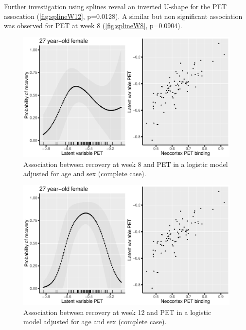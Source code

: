 \documentclass[12pt]{article}
\begin{document}
\vfill

Further investigation using splines reveal an inverted U-shape for the
PET assocation (\autoref{fig:splineW12}, p=0.0128). A similar but non
significant association was observed for PET at week 8 (\autoref{fig:splineW8},
p=0.0904).
\vfill

\begin{figure}[!h]
\centering
\includegraphics[trim={0 0 0 0},width=\textwidth]{./figures/gg-spline-w8.pdf}
\caption{\label{fig:splineW8}Association between recovery at week 8 and PET in a logistic model adjusted for age and sex (complete case).}
\end{figure}

\clearpage

\begin{figure}[!h]
\centering
\includegraphics[trim={0 0 0 0},width=\textwidth]{./figures/gg-spline-w12.pdf}
\caption{\label{fig:splineW12}Association between recovery at week 12 and PET in a logistic model adjusted for age and sex (complete case).}
\end{figure}
\end{document}
